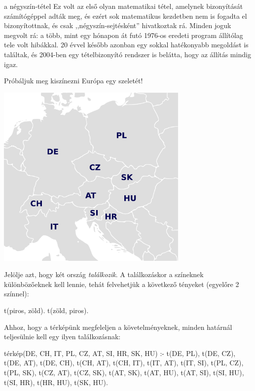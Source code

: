 \begin{infobox}{0.75}{a négyszín-tétel}
Ez volt az első olyan matematikai tétel, amelynek
bizonyítását számítógéppel adták meg, és ezért sok
matematikus kezdetben nem is fogadta el
bizonyítottnak, és csak ,,négyszín-sejtésként''
hivatkoztak rá. Minden joguk megvolt rá: a több,
mint egy hónapon át futó 1976-os eredeti program
állítólag tele volt hibákkal. 20 évvel később
azonban egy sokkal hatékonyabb megoldást is
találtak, és 2004-ben egy tételbizonyító rendszer is
belátta, hogy az állítás mindig igaz.
\end{infobox}

Próbáljuk meg kiszínezni Európa egy szeletét!

\begin{center}
  \includegraphics[width=0.7\textwidth]{images/europe.pdf}
\end{center}

Jelölje  azt, hogy két ország
\emph{találkozik}. A találkozáskor a színeknek
különbözőeknek kell lennie, tehát felvehetjük a
következő tényeket (egyelőre 2 színnel):
\begin{program}
t(piros, zöld). t(zöld, piros).
\end{program}
Ahhoz, hogy a térképünk megfeleljen a
követelményeknek, minden határnál teljesülnie kell
egy ilyen találkozásnak:
\begin{program}
térkép(DE, CH, IT, PL, CZ, AT, SI, HR, SK, HU) :-
    t(DE, PL), t(DE, CZ), t(DE, AT), t(DE, CH),
    t(CH, AT), t(CH, IT),
    t(IT, AT), t(IT, SI),
    t(PL, CZ), t(PL, SK),
    t(CZ, AT), t(CZ, SK),
    t(AT, SK), t(AT, HU), t(AT, SI),
    t(SI, HU), t(SI, HR),
    t(HR, HU),
    t(SK, HU).
\end{program}


